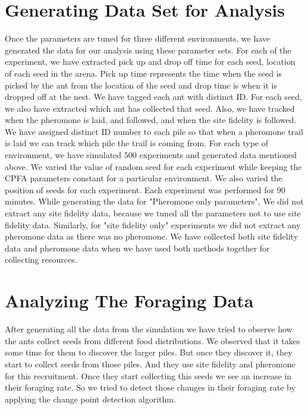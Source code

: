 \section{\label{section:Generating Data Set for Analysis}Generating Data Set for Analysis}
 Once the parameters are tuned for three different environments, we have generated the data for our analysis using these parameter sets. For each of the experiment, we have extracted pick up and drop off time for each seed, location of each seed in the arena. Pick up time represents the time when the seed is picked by the ant from the location of the seed and drop time is when it is dropped off at the nest. We have tagged each ant with distinct ID. For each seed, we also have extracted which ant has collected that seed. Also, we have tracked when the pheromone is laid, and followed, and when the site fidelity is followed. We have assigned distinct ID number to each pile so that when a pheromone trail is laid we can track which pile the trail is coming from. For each type of environment, we have simulated $500$ experiments and generated data mentioned above. We varied the value of random seed for each experiment while keeping the CPFA parameters constant for a particular environment. We also varied the position of seeds for each experiment. Each experiment was performed for $90$ minutes. While generating the data for "Pheromone only parameters", We did not extract any site fidelity data, because we tuned all the parameters not to use site fidelity data. Similarly, for "site fidelity only" experiments we did not extract any pheromone data as there was no pheromone. We have collected both site fidelity data and pheromone data when we have used both methods together for collecting resources.
 \section{\label{Analyzing The Foraging Data}Analyzing The Foraging Data}
 After generating all the data from the simulation we have tried to observe how the ants collect seeds from different food distributions. We observed that it takes some time for them to discover the larger piles. But once they discover it, they start to collect seeds from those piles. And they use site fidelity and pheromone for this recruitment. Once they start collecting this seeds we see an increase in their foraging rate. So we tried to detect those changes in their foraging rate by applying the change point detection algorithm. 
